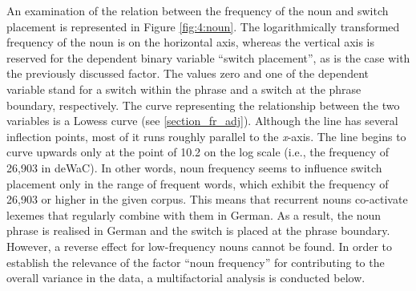 \begin{table}
\caption{German and mixed noun phrases, ranked in order of lowest (above) and highest (below) frequencies of the nouns involved.} \label{tab:4:6}
\end{table}

\begin{sloppypar}
An examination of the relation between the frequency of the noun and switch placement is represented in Figure \ref{fig:4:noun}. The logarithmically transformed frequency of the noun is on the horizontal axis, whereas the vertical axis is reserved for the dependent binary variable “switch placement”, as is the case with the previously discussed factor. The values zero and one of the dependent variable stand for a switch within the phrase and a switch at the phrase boundary, respectively. The curve representing the relationship between the two variables is a Lowess curve (see \ref{section_fr_adj}). Although the line has several inflection points, most of it runs roughly parallel to the \textit{x}-axis. The line begins to curve upwards only at the point of 10.2 on the log scale (i.e., the frequency of 26,903 in deWaC). In other words, noun frequency seems to influence switch placement only in the range of frequent words, which exhibit the frequency of 26,903 or higher in the given corpus. This means that recurrent nouns co-activate lexemes that regularly combine with them in German. As a result, the noun phrase is realised in German and the switch is placed at the phrase boundary. However, a reverse effect for low-frequency nouns cannot be found. In order to establish the relevance of the factor “noun frequency” for contributing to the overall variance in the data, a  multifactorial analysis is conducted below.
\end{sloppypar}

